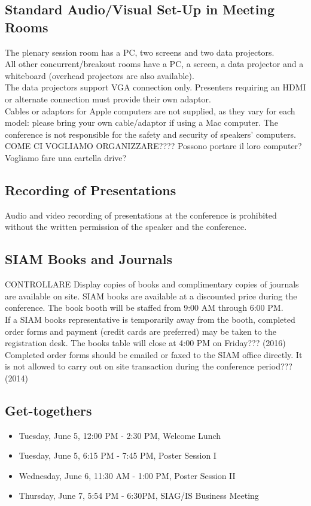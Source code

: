 \begin{multicols}{2}
\subsection*{Standard Audio/Visual Set-Up in Meeting Rooms}
The plenary session room has a PC, two screens and two data projectors.\\ 
All other concurrent/breakout rooms have a PC, a screen, a data projector and a whiteboard (overhead projectors are also available).\\
The data projectors support VGA connection only. Presenters requiring an HDMI or alternate connection must provide their own adaptor.\\
Cables or adaptors for Apple computers are not supplied, as they vary for each model: please bring your own cable/adaptor if using a Mac computer. 
The conference is not responsible for the safety and security of speakers' computers.\\
COME CI VOGLIAMO ORGANIZZARE???? Possono portare il loro computer? Vogliamo fare una cartella drive? 
\subsection*{Recording of Presentations}
Audio and video recording of presentations at the conference is prohibited without the written permission of the speaker and the conference.
\subsection*{SIAM Books and Journals}CONTROLLARE
Display copies of books and complimentary copies of journals are available on site. SIAM books are available at a discounted price during the conference. The book booth will be staffed from 9:00 AM through 6:00 PM. \\If a SIAM books representative is temporarily away from the booth, completed order forms and payment (credit cards are preferred) may be taken to the registration desk. The books table will close at 4:00 PM on Friday??? (2016)\\
Completed order forms should be emailed or faxed to the SIAM office directly. It is not allowed to carry out on site transaction during the conference period??? (2014)
\subsection*{Get-togethers}
\begin{itemize}
\item Tuesday, June 5, 12:00 PM - 2:30 PM, Welcome Lunch
\item Tuesday, June 5, 6:15 PM - 7:45 PM, Poster Session I
\item Wednesday, June 6, 11:30 AM - 1:00 PM, Poster Session II
\item Thursday, June 7, 5:54 PM - 6:30PM, SIAG/IS Business Meeting
\end{itemize}

\end{multicols}
